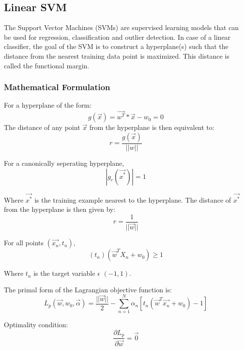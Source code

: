 \documentclass[11pt,a4paper]{article}
\newcommand{\noi}{\noindent}
\begin{document}
\subsection{Linear SVM}
\label{subsection:1A_svm}
The Support Vector Machines (SVMs) are supervised learning models that can be used for regression, classification and outlier detection. In case of a linear classifier, the goal of the SVM is to construct a hyperplane(s) such that the distance from the nearest training data point is maximized. This distance is called the functional margin.  


\subsubsection{Mathematical Formulation}
\noindent
For a hyperplane of the form:
\begin{equation}
    g(\vec{x})=\vec{w^{T}}*\vec{x}-w_{0}=0
\end{equation}
\noi
The distance of any point $\vec{x}$ from the hyperplane is then equivalent to: 
\begin{equation}
    r=\frac{g(\vec{x})}{||w||}
\end{equation}

\noi
For a canonically seperating hyperplane, 
\begin{equation}
    |g_c(\vec{x^*})|=1
\end{equation}

\noi
Where $\vec{x^*}$ is the training example nearest to the hyperplane. 
The distance of $\vec{x^*}$ from the hyperplane is then given by:
\begin{equation}
    r=\frac{1}{||\vec{w}||}
\end{equation}

\noi
For all points $(\vec{x_n},t_n)$, 
\begin{equation}
    (t_n)(\vec{w}^{T}X_n+w_0) \geq 1
\end{equation}

\noi
Where $t_n$ is the target variable $\epsilon$ $(-1,1)$.

\noi
The primal form of the Lagrangian objective function is:
\begin{equation}
    L_p(\vec{w},w_0,\vec{\alpha})=\frac{||\vec{w}||}{2}-\sum_{n=1}^{N}\alpha_n[t_n(\vec{w}^T\vec{x_n}+w_0)-1]
\end{equation}

\noi
Optimality condition:
\begin{equation}
    \frac{\partial L_p}{\partial \vec{w}}=\vec{0}
\end{equation}
\end{document}
